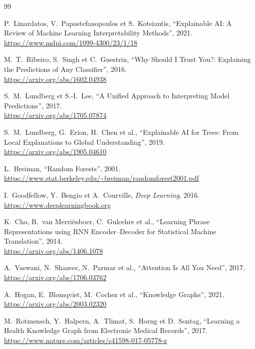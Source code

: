 \documentclass[12pt,a4paper]{article}
\begin{document}
\newpage
\begin{thebibliography}{99}

P.~Linardatos, V.~Papastefanopoulos et S.~Kotsiantis,
``Explainable AI: A Review of Machine Learning Interpretability Methods'',
2021.\\
\url{https://www.mdpi.com/1099-4300/23/1/18}

M.~T.~Ribeiro, S.~Singh et C.~Guestrin,
``Why Should I Trust You?: Explaining the Predictions of Any Classifier'',
2016.\\
\url{https://arxiv.org/abs/1602.04938}

S.~M.~Lundberg et S.-I.~Lee,
``A Unified Approach to Interpreting Model Predictions'',
2017.\\
\url{https://arxiv.org/abs/1705.07874}

S.~M.~Lundberg, G.~Erion, H.~Chen et al.,
``Explainable AI for Trees: From Local Explanations to Global Understanding'',
2019.\\
\url{https://arxiv.org/abs/1905.04610}

L.~Breiman,
``Random Forests'',
2001.\\
\url{https://www.stat.berkeley.edu/~breiman/randomforest2001.pdf}

I.~Goodfellow, Y.~Bengio et A.~Courville,
\emph{Deep Learning},
2016.\\
\url{https://www.deeplearningbook.org}

K.~Cho, B.~van Merriënboer, C.~Gulcehre et al.,
``Learning Phrase Representations using RNN Encoder--Decoder for Statistical
Machine Translation'',
2014.\\
\url{https://arxiv.org/abs/1406.1078}

A.~Vaswani, N.~Shazeer, N.~Parmar et al.,
``Attention Is All You Need'',
2017.\\
\url{https://arxiv.org/abs/1706.03762}

A.~Hogan, E.~Blomqvist, M.~Cochez et al.,
``Knowledge Graphs'',
2021.\\
\url{https://arxiv.org/abs/2003.02320}

M.~Rotmensch, Y.~Halpern, A.~Tlimat, S.~Horng et D.~Sontag,
``Learning a Health Knowledge Graph from Electronic Medical Records'',
2017.\\
\url{https://www.nature.com/articles/s41598-017-05778-z}


\end{thebibliography}
\end{document}
